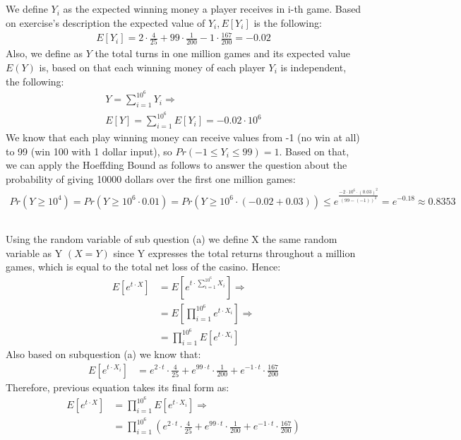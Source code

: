 \documentclass[11pt]{537homework}
\begin{document}
\subsection{}
We define $Y_i$ as the expected winning money a player receives in i-th game. Based on exercise's description the expected value of $Y_i, E[Y_i] $ is the following:
\begin{align*}
 E[Y_i] = 2 \cdot \frac{4}{25} + 99 \cdot \frac{1}{200} -1 \cdot \frac{167}{200}= -0.02
\end{align*}
Also, we define as $Y$ the total turns in one million games and its expected value $E(Y)$ is, based on that each winning money of each player $Y_i$ is independent, the following: 
\begin{align*}
Y = \sum_{i=1}^{10^6} Y_i \Longrightarrow \\
 E[Y] =\sum_{i=1}^{10^6} E[Y_i] = -0.02 \cdot 10^6
\end{align*}
We know that each play winning money can receive values from -1 (no win at all) to 99 (win 100 with 1 dollar input), so $Pr(-1 \leq Y_i\leq 99) = 1$. Based on that, we can apply the Hoeffding Bound as follows to answer the question about the probability of giving 10000 dollars over the first one million games: 
\begin{align*}
Pr(Y \geq 10^4) = Pr(Y \geq 10^6 \cdot 0.01) = Pr(Y \geq 10^6 \cdot(-0.02 + 0.03)) \leq e^{\frac{-2\cdot 10^6 \cdot (0.03)^2}{(99 - (-1))^2}} = e^{-0.18} \approx 0.8353 
\end{align*}
\subsection{}
Using the random variable of sub question (a) we define X the same random variable as Y $(X = Y)$ since Y expresses the total returns throughout a million games, which is equal to the total net loss of the casino. Hence:
\begin{align*}
E[e^{t\cdot X}] &= E[e^{t\cdot \sum_{i=1}^{10^6} X_i}]  \Longrightarrow \\
                &= E[\prod_{i=1}^{10^6} e^{t\cdot X_i}] \Longrightarrow \\
                &= \prod_{i=1}^{10^6} E[e^{t\cdot X_i}] 
\end{align*}
Also based on subquestion (a) we know that:\\
\begin{align*}
E[e^{t\cdot X_i}] &= e^{2\cdot t} \cdot \frac{4}{25} + e^{99 \cdot t} \cdot \frac{1}{200} + e^{-1 \cdot t} \cdot \frac{167}{200}
\end{align*}
Therefore, previous equation takes its final form as:
\begin{align*}
E[e^{t\cdot X}] &= \prod_{i=1}^{10^6} E[e^{t\cdot X_i}] \Longrightarrow \\
                &= \prod_{i=1}^{10^6} (e^{2\cdot t} \cdot \frac{4}{25} + e^{99 \cdot t} \cdot \frac{1}{200} + e^{-1 \cdot t} \cdot \frac{167}{200})
\end{align*}
\end{document}
